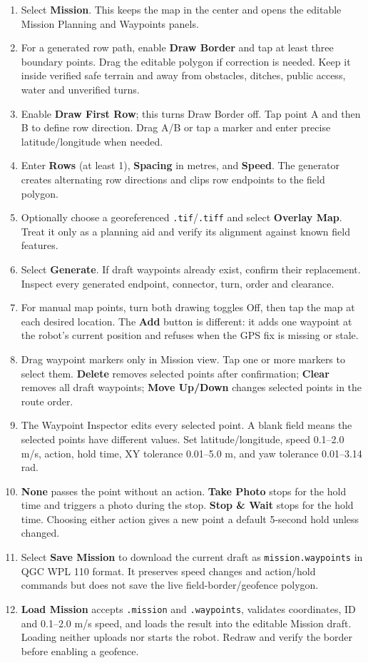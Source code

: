 \documentclass[
  10pt,
  letterpaper,
  openany]{report}
\providecommand{\tightlist}{%
  \setlength{\itemsep}{0pt}\setlength{\parskip}{0pt}}
\begin{document}
\begin{enumerate}
\tightlist
\item
  Select \textbf{Mission}. This keeps the map in the center and opens
  the editable Mission Planning and Waypoints panels.
\item
  For a generated row path, enable \textbf{Draw Border} and tap at least
  three boundary points. Drag the editable polygon if correction is
  needed. Keep it inside verified safe terrain and away from obstacles,
  ditches, public access, water and unverified turns.
\item
  Enable \textbf{Draw First Row}; this turns Draw Border off. Tap point
  A and then B to define row direction. Drag A/B or tap a marker and
  enter precise latitude/longitude when needed.
\item
  Enter \textbf{Rows} (at least 1), \textbf{Spacing} in metres, and
  \textbf{Speed}. The generator creates alternating row directions and
  clips row endpoints to the field polygon.
\item
  Optionally choose a georeferenced \texttt{.tif}/\texttt{.tiff} and
  select \textbf{Overlay Map}. Treat it only as a planning aid and
  verify its alignment against known field features.
\item
  Select \textbf{Generate}. If draft waypoints already exist, confirm
  their replacement. Inspect every generated endpoint, connector, turn,
  order and clearance.
\item
  For manual map points, turn both drawing toggles Off, then tap the map
  at each desired location. The \textbf{Add} button is different: it
  adds one waypoint at the robot's current position and refuses when the
  GPS fix is missing or stale.
\item
  Drag waypoint markers only in Mission view. Tap one or more markers to
  select them. \textbf{Delete} removes selected points after
  confirmation; \textbf{Clear} removes all draft waypoints; \textbf{Move
  Up/Down} changes selected points in the route order.
\item
  The Waypoint Inspector edits every selected point. A blank field means
  the selected points have different values. Set latitude/longitude,
  speed 0.1--2.0 m/s, action, hold time, XY tolerance 0.01--5.0 m, and
  yaw tolerance 0.01--3.14 rad.
\item
  \textbf{None} passes the point without an action. \textbf{Take Photo}
  stops for the hold time and triggers a photo during the stop.
  \textbf{Stop \& Wait} stops for the hold time. Choosing either action
  gives a new point a default 5-second hold unless changed.
\item
  Select \textbf{Save Mission} to download the current draft as
  \texttt{mission.waypoints} in QGC WPL 110 format. It preserves speed
  changes and action/hold commands but does not save the live
  field-border/geofence polygon.
\item
  \textbf{Load Mission} accepts \texttt{.mission} and
  \texttt{.waypoints}, validates coordinates, ID and 0.1--2.0 m/s speed,
  and loads the result into the editable Mission draft. Loading neither
  uploads nor starts the robot. Redraw and verify the border before
  enabling a geofence.
\end{enumerate}
\end{document}

